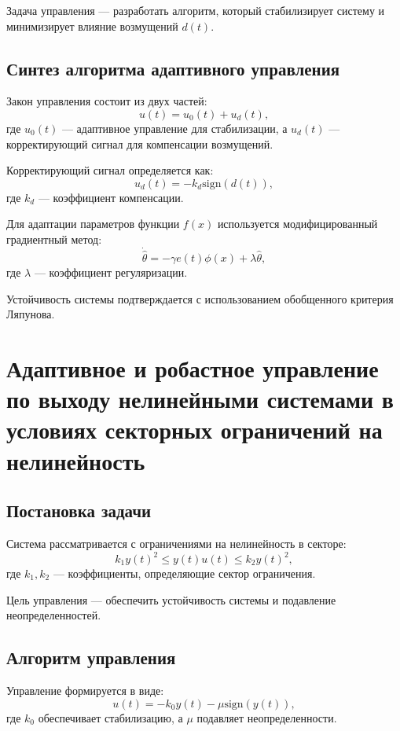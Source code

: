 \documentclass[a4paper,14pt]{extarticle} %
\begin{document}
Задача управления — разработать алгоритм, который стабилизирует систему и минимизирует влияние возмущений $d(t)$.

\subsection*{Синтез алгоритма адаптивного управления}
Закон управления состоит из двух частей:
\begin{equation}
u(t) = u_0(t) + u_d(t),
\end{equation}
где $u_0(t)$ — адаптивное управление для стабилизации, а $u_d(t)$ — корректирующий сигнал для компенсации возмущений.

Корректирующий сигнал определяется как:
\begin{equation}
u_d(t) = -k_d \text{sign}(d(t)),
\end{equation}
где $k_d$ — коэффициент компенсации.

Для адаптации параметров функции $f(x)$ используется модифицированный градиентный метод:
\begin{equation}
\dot{\hat{\theta}} = -\gamma e(t)\phi(x) + \lambda \hat{\theta},
\end{equation}
где $\lambda$ — коэффициент регуляризации.

Устойчивость системы подтверждается с использованием обобщенного критерия Ляпунова.

\section{Адаптивное и робастное управление по выходу нелинейными системами в условиях секторных ограничений на нелинейность}
\subsection*{Постановка задачи}
Система рассматривается с ограничениями на нелинейность в секторе:
\begin{equation}
k_1 y(t)^2 \leq y(t)u(t) \leq k_2 y(t)^2,
\end{equation}
где $k_1, k_2$ — коэффициенты, определяющие сектор ограничения.

Цель управления — обеспечить устойчивость системы и подавление неопределенностей.

\subsection*{Алгоритм управления}
Управление формируется в виде:
\begin{equation}
u(t) = -k_0 y(t) - \mu \text{sign}(y(t)),
\end{equation}
где $k_0$ обеспечивает стабилизацию, а $\mu$ подавляет неопределенности.
\end{document}

